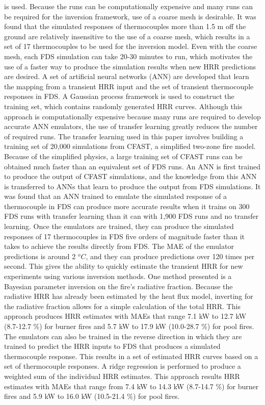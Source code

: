 \documentclass{article}
\begin{document}
is used. Because the runs can be computationally expensive and many runs can be required for the inversion framework, use of a coarse mesh is desirable. It was found that the simulated responses of thermocouples more than 1.5 m off the ground are relatively insensitive to the use of a coarse mesh, which results in a set of 17 thermocouples to be used for the inversion model. Even with the coarse mesh, each FDS simulation can take 20-30 minutes to run, which motivates the use of a faster way to produce the simulation results when new HRR predictions are desired. A set of artificial neural networks (ANN) are developed that learn the mapping from a transient HRR input and the set of transient thermocouple responses in FDS. A Gaussian process framework is used to construct the training set, which contains randomly generated HRR curves. Although this approach is computationally expensive because many runs are required to develop accurate ANN emulators, the use of transfer learning greatly reduces the number of required runs. The transfer learning used in this paper involves building a training set of 20,000 simulations from CFAST, a simplified two-zone fire model. Because of the simplified physics, a large training set of CFAST runs can be obtained much faster than an equivalent set of FDS runs. An ANN is first trained to produce the output of CFAST simulations, and the knowledge from this ANN is transferred to ANNs that learn to produce the output from FDS simulations. It was found that an ANN trained to emulate the simulated response of a thermocouple in FDS can produce more accurate results when it trains on 300 FDS runs with transfer learning than it can with 1,900 FDS runs and no transfer learning. Once the emulators are trained, they can produce the simulated responses of 17 thermocouples in FDS five orders of magnitude faster than it takes to achieve the results directly from FDS. The MAE of the emulator predictions is around 2 $^oC$, and they can produce predictions over 120 times per second. This gives the ability to quickly estimate the transient HRR for new experiments using various inversion methods. One method presented is a Bayesian parameter inversion on the fire's radiative fraction. Because the radiative HRR has already been estimated by the heat flux model, inverting for the radiative fraction allows for a simple calculation of the total HRR. This approach produces HRR estimates with MAEs that range 7.1 kW to 12.7 kW (8.7-12.7 \%) for burner fires and 5.7 kW to 17.9 kW (10.0-28.7 \%) for pool fires. The emulators can also be trained in the reverse direction in which they are trained to predict the HRR inputs to FDS that produces a simulated thermocouple response. This results in a set of estimated HRR curves based on a set of thermocouple responses. A ridge regression is performed to produce a weighted sum of the individual HRR estimates. This approach results HRR estimates with MAEs that range from 7.4 kW to 14.3 kW (8.7-14.7 \%) for burner fires and 5.9 kW to 16.0 kW (10.5-21.4 \%) for pool fires. 



\end{document}
